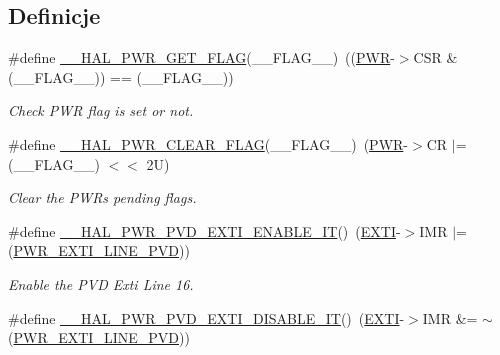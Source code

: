 \subsection*{Definicje}
\begin{DoxyCompactItemize}
\item 
\#define \hyperlink{group___p_w_r___exported___macro_ga2977135bbea35b786805eea640d1c884}{\+\_\+\+\_\+\+H\+A\+L\+\_\+\+P\+W\+R\+\_\+\+G\+E\+T\+\_\+\+F\+L\+AG}(\+\_\+\+\_\+\+F\+L\+A\+G\+\_\+\+\_\+)~((\hyperlink{group___peripheral__declaration_ga04651c526497822a859942b928e57f8e}{P\+WR}-\/$>$C\+SR \& (\+\_\+\+\_\+\+F\+L\+A\+G\+\_\+\+\_\+)) == (\+\_\+\+\_\+\+F\+L\+A\+G\+\_\+\+\_\+))
\begin{DoxyCompactList}\small\item\em Check P\+WR flag is set or not. \end{DoxyCompactList}\item 
\#define \hyperlink{group___p_w_r___exported___macro_ga96f24bf4b16c9f944cd829100bf746e5}{\+\_\+\+\_\+\+H\+A\+L\+\_\+\+P\+W\+R\+\_\+\+C\+L\+E\+A\+R\+\_\+\+F\+L\+AG}(\+\_\+\+\_\+\+F\+L\+A\+G\+\_\+\+\_\+)~(\hyperlink{group___peripheral__declaration_ga04651c526497822a859942b928e57f8e}{P\+WR}-\/$>$CR $\vert$=  (\+\_\+\+\_\+\+F\+L\+A\+G\+\_\+\+\_\+) $<$$<$ 2\+U)
\begin{DoxyCompactList}\small\item\em Clear the P\+WR\textquotesingle{}s pending flags. \end{DoxyCompactList}\item 
\#define \hyperlink{group___p_w_r___exported___macro_ga3180f039cf14ef78a64089f387f8f9c2}{\+\_\+\+\_\+\+H\+A\+L\+\_\+\+P\+W\+R\+\_\+\+P\+V\+D\+\_\+\+E\+X\+T\+I\+\_\+\+E\+N\+A\+B\+L\+E\+\_\+\+IT}()~(\hyperlink{group___peripheral__declaration_ga9189e770cd9b63dadd36683eb9843cac}{E\+X\+TI}-\/$>$I\+MR $\vert$= (\hyperlink{group___p_w_r___p_v_d___e_x_t_i___line_ga43a49255649e03d2d2b6b12c5c379d2b}{P\+W\+R\+\_\+\+E\+X\+T\+I\+\_\+\+L\+I\+N\+E\+\_\+\+P\+VD}))
\begin{DoxyCompactList}\small\item\em Enable the P\+VD Exti Line 16. \end{DoxyCompactList}\item 
\#define \hyperlink{group___p_w_r___exported___macro_gad240d7bf8f15191b068497b9aead1f1f}{\+\_\+\+\_\+\+H\+A\+L\+\_\+\+P\+W\+R\+\_\+\+P\+V\+D\+\_\+\+E\+X\+T\+I\+\_\+\+D\+I\+S\+A\+B\+L\+E\+\_\+\+IT}()~(\hyperlink{group___peripheral__declaration_ga9189e770cd9b63dadd36683eb9843cac}{E\+X\+TI}-\/$>$I\+MR \&= $\sim$(\hyperlink{group___p_w_r___p_v_d___e_x_t_i___line_ga43a49255649e03d2d2b6b12c5c379d2b}{P\+W\+R\+\_\+\+E\+X\+T\+I\+\_\+\+L\+I\+N\+E\+\_\+\+P\+VD}))
$$
\end{DoxyCompactItemize}
